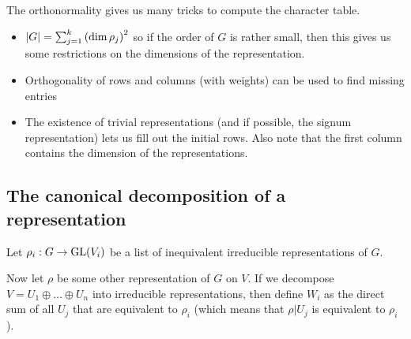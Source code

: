The orthonormality gives us many tricks to compute the character table.
\begin{itemize}
  \item  $\vert G\vert = \sum_{j=1}^{k} \left(\dim \rho_j\right)^{2}$
    so if the order of $G$ is rather small, then this gives us some restrictions on the dimensions of the representation.
  \item Orthogonality of rows and columns (with weights) can be used to find missing entries
  \item The existence of trivial representations (and if possible, the signum representation) lets us fill out the initial rows.
    Also note that the first column contains the dimension of the representations.
\end{itemize}

\subsection{The canonical decomposition of a representation}
Let $\rho_i: G \to \operatorname{GL}(V_i)$ be a list of inequivalent irreducible representations of $G$.

Now let $\rho$ be some other representation of $G$ on $V$.
If we decompose $V = U_{1}\oplus \ldots \oplus U_{n}$ into irreducible representations, then define $W_i$ as the direct sum of all $U_j$ that are equivalent to $\rho_i$ (which means that $\rho|U_j$ is equivalent to $\rho_i$).

